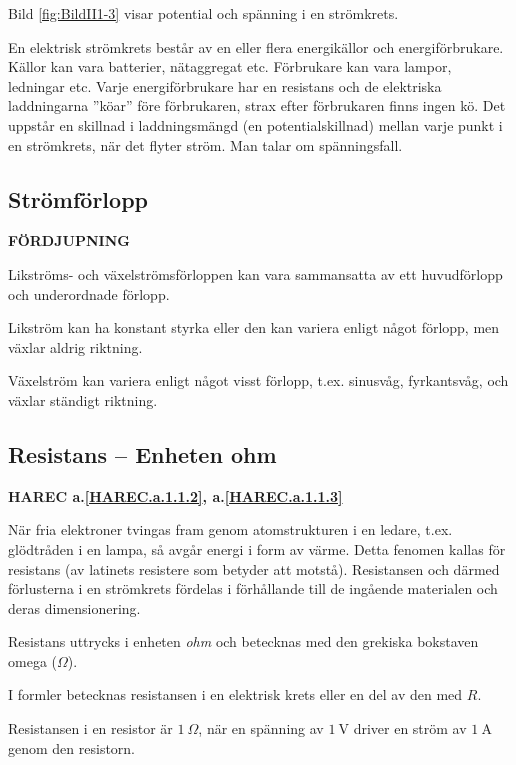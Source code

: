Bild \ref{fig:BildII1-3} visar potential och spänning i en strömkrets.

En elektrisk strömkrets består av en eller flera energikällor och
energiförbrukare.
Källor kan vara batterier, nätaggregat etc.
Förbrukare kan vara lampor, ledningar etc.
Varje energiförbrukare har en resistans och de elektriska laddningarna ''köar''
före förbrukaren, strax efter förbrukaren finns ingen kö.
Det uppstår en skillnad i laddningsmängd (en potentialskillnad) mellan varje
punkt i en strömkrets, när det flyter ström.
Man talar om spänningsfall.

\subsection{Strömförlopp}
\textbf{FÖRDJUPNING}

Likströms- och växelströmsförloppen kan vara sammansatta av ett huvudförlopp och
underordnade förlopp.

Likström kan ha konstant styrka eller den kan variera enligt något förlopp, men
växlar aldrig riktning.

Växelström kan variera enligt något visst förlopp, t.ex. sinusvåg,
fyrkantsvåg, och växlar ständigt riktning.

\subsection{Resistans -- Enheten ohm}
\textbf{HAREC a.\ref{HAREC.a.1.1.2}\label{myHAREC.a.1.1.2c}, a.\ref{HAREC.a.1.1.3}\label{myHAREC.a.1.1.3c}}

När fria elektroner tvingas fram genom atomstrukturen i en ledare, t.ex.
glödtråden i en lampa, så avgår energi i form av värme.
Detta fenomen kallas för resistans (av latinets resistere som betyder att
motstå).
Resistansen och därmed förlusterna i en strömkrets fördelas i
förhållande till de ingående materialen och deras dimensionering.

Resistans uttrycks i enheten \emph{ohm} \cite{SIbrochure8} och betecknas med
den grekiska bokstaven omega (\(\Omega\)).

I formler betecknas resistansen i en elektrisk krets eller en del av den med
\(R\).

Resistansen i en resistor är \(1\ \Omega\), när en spänning av \(1\ \mathrm{V}\)
driver en ström av \(1\ \mathrm{A}\) genom den resistorn.

